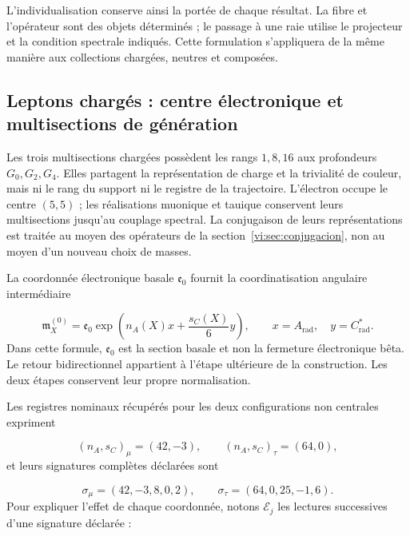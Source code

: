 L’individualisation conserve ainsi la portée de chaque résultat. La fibre
et l’opérateur sont des objets déterminés ; le passage à une raie utilise le
projecteur et la condition spectrale indiqués. Cette formulation s’appliquera
de la même manière aux collections chargées, neutres et composées.


\subsection{Leptons chargés : centre électronique et multisections de génération
}
\label{vi:subsec:leptones-cargados}

Les trois multisections chargées possèdent les rangs \(1,8,16\) aux profondeurs
\(G_0,G_2,G_4\). Elles partagent la représentation de charge et la trivialité
de couleur, mais ni le rang du support ni le registre de la trajectoire.
L’électron occupe le centre \((5,5)\) ; les réalisations muonique et
tauique conservent leurs multisections jusqu’au couplage
spectral. La conjugaison de leurs représentations est traitée au moyen des
opérateurs de la section~\ref{vi:sec:conjugacion}, non au moyen d’un nouveau
choix de masses.


La coordonnée électronique basale \(\mathfrak e_0\) fournit la coordinatisation
angulaire intermédiaire

\begin{equation}
 \mathfrak m_X^{(0)}=\mathfrak e_0
 \exp\left(n_A(X)x+\frac{s_C(X)}6y\right),
 \qquad x=A_{\mathrm{rad}},\quad y=C^*_{\mathrm{rad}}.
 \label{vi:eq:carta-angular-familias}
\end{equation}
Dans cette formule, \(\mathfrak e_0\) est la section basale et non la fermeture
électronique bêta. Le retour bidirectionnel appartient à l’étape ultérieure
de la construction. Les deux étapes conservent leur propre normalisation.


Les registres nominaux récupérés pour les deux configurations non centrales
expriment

\[
 (n_A,s_C)_\mu=(42,-3),\qquad (n_A,s_C)_\tau=(64,0),
\]
et leurs signatures complètes déclarées sont

\begin{equation}
 \sigma_\mu=(42,-3,8,0,2),\qquad
 \sigma_\tau=(64,0,25,-1,6).
 \label{vi:eq:firmas-muon-tau}
\end{equation}
Pour expliquer l’effet de chaque coordonnée, notons \(\mathcal E_j\)
les lectures successives d’une signature déclarée :

